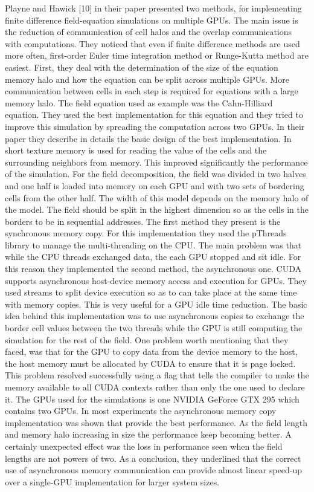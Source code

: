 Playne and Hawick [10] in their paper presented two methods, for implementing finite difference field-equation simulations on multiple GPUs. The main issue is the reduction of communication of cell halos and the overlap communications with computations. They noticed that even if finite difference methods are used more often, first-order Euler time integration method or Runge-Kutta method are easiest. First, they deal with the determination of the size of the equation memory halo and how the equation can be split across multiple GPUs. More communication between cells in each step is required for equations with a large memory halo. The field equation used as example was the Cahn-Hilliard equation. They used the best implementation for this equation and they tried to improve this simulation by spreading the computation across two GPUs. In their paper they describe in details the basic design of the best implementation. In short texture memory is used for reading the value of the cells and the surrounding neighbors from memory. This improved significantly the performance of the simulation. For the field decomposition, the field was divided in two halves and one half is loaded into memory on each GPU and with two sets of bordering cells from the other half. The width of this model depends on the memory halo of the model. The field should be split in the highest dimension so as the cells in the borders to be in sequential addresses. The first method they present is the synchronous memory copy. For this implementation they used the pThreads library to manage the multi-threading on the CPU. The main problem was that while the CPU threads exchanged data, the each GPU stopped and sit idle. For this reason they implemented the second method, the asynchronous one. CUDA supports asynchronous host-device memory access and execution for GPUs. They used streams to split device execution so as to can take place at the same time with memory copies. This is very useful for a GPU idle time reduction. The basic idea behind this implementation was to use asynchronous copies to exchange the border cell values between the two threads while the GPU is still computing the simulation for the rest of the field. One problem worth mentioning that they faced, was that for the GPU to copy data from the device memory to the host, the host memory must be allocated by CUDA to ensure that it is page locked. This problem resolved successfully using a flag that tells the compiler to make the memory available to all CUDA contexts rather than only the one used to declare it. The GPUs used for the simulations is one NVIDIA GeForce GTX 295 which contains two GPUs. In most experiments the asynchronous memory copy implementation was shown that provide the best performance. As the field length and memory halo increasing in size the performance keep becoming better. A certainly unexpected effect was the loss in performance seen when the field lengths are not powers of two. As a conclusion, they underlined that the correct use of asynchronous memory communication can provide almost linear speed-up over a single-GPU implementation for larger system sizes.



